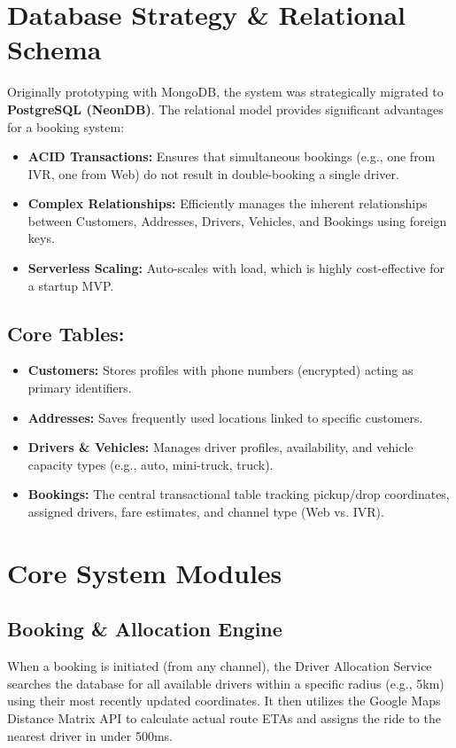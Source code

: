 \documentclass[journal,10pt,twocolumn]{IEEEtran}
\begin{document}
\section{Database Strategy \& Relational Schema}
Originally prototyping with MongoDB, the system was strategically migrated to \textbf{PostgreSQL (NeonDB)}. The relational model provides significant advantages for a booking system:
\begin{itemize}
    \item \textbf{ACID Transactions:} Ensures that simultaneous bookings (e.g., one from IVR, one from Web) do not result in double-booking a single driver.
    \item \textbf{Complex Relationships:} Efficiently manages the inherent relationships between Customers, Addresses, Drivers, Vehicles, and Bookings using foreign keys.
    \item \textbf{Serverless Scaling:} Auto-scales with load, which is highly cost-effective for a startup MVP.
\end{itemize}

\subsection{Core Tables:}
\begin{itemize}
    \item \textbf{Customers:} Stores profiles with phone numbers (encrypted) acting as primary identifiers.
    \item \textbf{Addresses:} Saves frequently used locations linked to specific customers.
    \item \textbf{Drivers \& Vehicles:} Manages driver profiles, availability, and vehicle capacity types (e.g., auto, mini-truck, truck).
    \item \textbf{Bookings:} The central transactional table tracking pickup/drop coordinates, assigned drivers, fare estimates, and channel type (Web vs. IVR).
\end{itemize}

\section{Core System Modules}

\subsection{Booking \& Allocation Engine}
When a booking is initiated (from any channel), the Driver Allocation Service searches the database for all available drivers within a specific radius (e.g., 5km) using their most recently updated coordinates. It then utilizes the Google Maps Distance Matrix API to calculate actual route ETAs and assigns the ride to the nearest driver in under 500ms.
\end{document}
